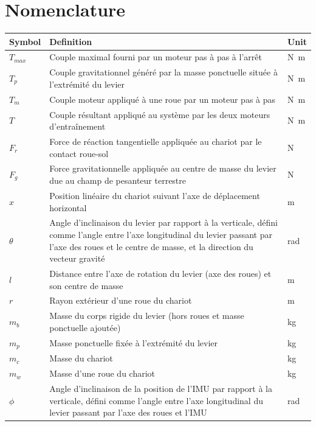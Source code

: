 \chapter*{Nomenclature}

\begin{longtable}{p{} p{} p{}}
\hline
\textbf{Symbol} & \textbf{Definition} & \textbf{Unit} \\
\hline
\endhead

$T_{max}$ & Couple maximal fourni par un moteur pas à pas à l'arrêt & \si{\newton\metre} \\
\hline
$T_p$ & Couple gravitationnel généré par la masse ponctuelle située à l'extrémité du levier & \si{\newton\metre} \\
\hline
$T_m$ & Couple moteur appliqué à une roue par un moteur pas à pas & \si{\newton\metre} \\
\hline
$T$ & Couple résultant appliqué au système par les deux moteurs d'entraînement & \si{\newton\metre} \\
\hline
$F_r$ & Force de réaction tangentielle appliquée au chariot par le contact roue-sol & \si{\newton} \\
\hline
$F_g$ & Force gravitationnelle appliquée au centre de masse du levier due au champ de pesanteur terrestre & \si{\newton} \\
\hline
$x$ & Position linéaire du chariot suivant l'axe de déplacement horizontal & \si{\metre} \\
\hline
$\theta$ & Angle d'inclinaison du levier par rapport à la verticale, défini comme l'angle entre l'axe longitudinal du levier passant par l'axe des roues et le centre de masse, et la direction du vecteur gravité & \si{\radian} \\
\hline
$l$ & Distance entre l'axe de rotation du levier (axe des roues) et son centre de masse & \si{\metre} \\
\hline
$r$ & Rayon extérieur d'une roue du chariot & \si{\metre} \\
\hline
$m_b$ & Masse du corps rigide du levier (hors roues et masse ponctuelle ajoutée) & \si{\kilogram} \\
\hline
$m_p$ & Masse ponctuelle fixée à l'extrémité du levier & \si{\kilogram} \\
\hline
$m_c$ & Masse du chariot & \si{\kilogram} \\
\hline
$m_w$ & Masse d'une roue du chariot & \si{\kilogram} \\
\hline
$\phi$ & Angle d'inclinaison de la position de l'IMU par rapport à la verticale, défini comme l'angle entre l'axe longitudinal du levier passant par l'axe des roues et l'IMU & \si{\radian} \\

\end{longtable}
